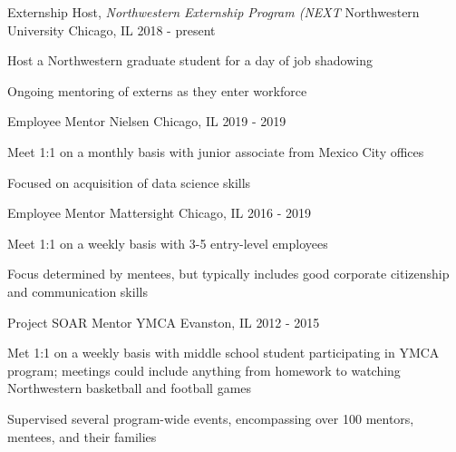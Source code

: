 

\begin{cventries}
  \cventry
    {Externship Host, \textit{Northwestern Externship Program (NEXT}} %
    {Northwestern University} %
    {Chicago, IL} %
    {2018 - present} %
    {
      \begin{cvitems} %
        \item {Host a Northwestern graduate student for a day of job shadowing}
        \item {Ongoing mentoring of externs as they enter workforce}
      \end{cvitems}
    }

  \cventry
    {Employee Mentor} %
    {Nielsen} %
    {Chicago, IL} %
    {2019 - 2019} %
    {
      \begin{cvitems} %
        \item {Meet 1:1 on a monthly basis with junior associate from Mexico City offices}
        \item {Focused on acquisition of data science skills}
      \end{cvitems}
    }

  \cventry
    {Employee Mentor} %
    {Mattersight} %
    {Chicago, IL} %
    {2016 - 2019} %
    {
      \begin{cvitems} %
        \item {Meet 1:1 on a weekly basis with 3-5 entry-level employees}
        \item {Focus determined by mentees, but typically includes good corporate citizenship and communication skills}
      \end{cvitems}
    }

  \cventry
    {Project SOAR Mentor} %
    {YMCA} %
    {Evanston, IL} %
    {2012 - 2015} %
    {
      \begin{cvitems} %
        \item {Met 1:1 on a weekly basis with middle school student participating in YMCA program; meetings could include anything from homework to watching Northwestern basketball and football games}
        \item {Supervised several program-wide events, encompassing  over 100 mentors, mentees, and their families}
      \end{cvitems}
    }

\end{cventries}
